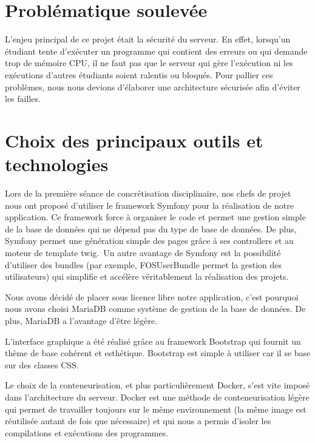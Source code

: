 \section{Problématique soulevée}

\par L'enjeu principal de ce projet était la sécurité du serveur. En effet, lorsqu'un étudiant tente d'exécuter un programme qui contient des erreurs ou qui demande trop de mémoire CPU, il ne faut pas que le serveur qui gère l'exécution ni les exécutions d'autres étudiants soient ralentis ou bloqués. Pour pallier ces problèmes, nous nous devions d'élaborer une architecture sécurisée afin d'éviter les failles.


\section{Choix des principaux outils et technologies}

\par Lors de la première séance de concrétisation disciplinaire, nos chefs de projet nous ont proposé d'utiliser le framework Symfony pour la réalisation de notre application. Ce framework force à organiser le code et permet une gestion simple de la base de données qui ne dépend pas du type de base de données. De plus, Symfony permet une génération simple des pages grâce à ses controllers et au moteur de template twig.\
Un autre avantage de Symfony est la possibilité d'utiliser des bundles (par exemple, FOSUserBundle permet la gestion des utilisateurs) qui simplifie et accélère véritablement la réalisation des projets. \\

\par Nous avons décidé de placer sous licence libre notre application, c'est pourquoi nous avons choisi MariaDB comme système de gestion de la base de données. De plus, MariaDB a l'avantage d'être légère. \\

\par L'interface graphique a été réalisé grâce au framework Bootstrap qui fournit un thème de base cohérent et esthétique. Bootstrap est simple à utiliser car il se base sur des classes CSS. \\

\par Le choix de la conteneurisation, et plus particulièrement Docker, s'est vite imposé dans l'architecture du serveur. Docker est une méthode de conteneurisation légère qui permet de travailler toujours sur le même environnement (la même image est réutilisée autant de fois que nécessaire) et qui nous a permis d'isoler les compilations et exécutions des programmes.

